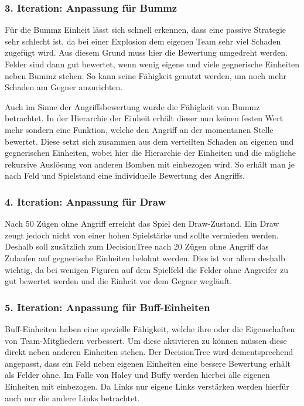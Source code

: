 \subsubsection{3. Iteration: Anpassung für Bummz}

Für die Bummz Einheit lässt sich schnell erkennen, dass eine passive Strategie sehr schlecht ist, da bei einer Explosion dem eigenen Team sehr viel Schaden zugefügt wird. Aus diesem Grund muss hier die Bewertung umgedreht werden. Felder sind dann gut bewertet, wenn wenig eigene und viele gegnerische Einheiten neben Bummz stehen. So kann seine Fähigkeit genutzt werden, um noch mehr Schaden am Gegner anzurichten. 

Auch im Sinne der Angriffsbewertung wurde die Fähigkeit von Bummz betrachtet. In der Hierarchie der Einheit erhält dieser nun keinen festen Wert mehr sondern eine Funktion, welche den Angriff an der momentanen Stelle bewertet. Diese setzt sich zusammen aus dem verteilten Schaden an eigenen und gegnerischen Einheiten, wobei hier die Hierarchie der Einheiten und die mögliche rekursive Auslösung von anderen Bomben mit einbezogen wird. So erhält man je nach Feld und Spielstand eine individuelle Bewertung des Angriffs.

\subsubsection{4. Iteration: Anpassung für Draw}

Nach 50 Zügen ohne Angriff erreicht das Spiel den Draw-Zustand. Ein Draw zeugt jedoch nicht von einer hohen Spielstärke und sollte vermieden werden. Deshalb soll zusätzlich zum DecisionTree nach 20 Zügen ohne Angriff das Zulaufen auf gegnerische Einheiten belohnt werden. Dies ist vor allem deshalb wichtig, da bei wenigen Figuren auf dem Spielfeld die Felder ohne Angreifer zu gut bewertet werden und die Einheit vor dem Gegner wegläuft.

\subsubsection{5. Iteration: Anpassung für Buff-Einheiten}

Buff-Einheiten haben eine spezielle Fähigkeit, welche ihre oder die Eigenschaften von Team-Mitgliedern verbessert. Um diese aktivieren zu können müssen diese direkt neben anderen Einheiten stehen. Der DecisionTree wird dementsprechend angepasst, dass ein Feld neben eigenen Einheiten eine bessere Bewertung erhält als Felder ohne. Im Falle von Haley und Buffy werden hierbei alle eigenen Einheiten mit einbezogen. Da Links nur eigene Links verstärken werden hierfür auch nur die andere Links betrachtet.

